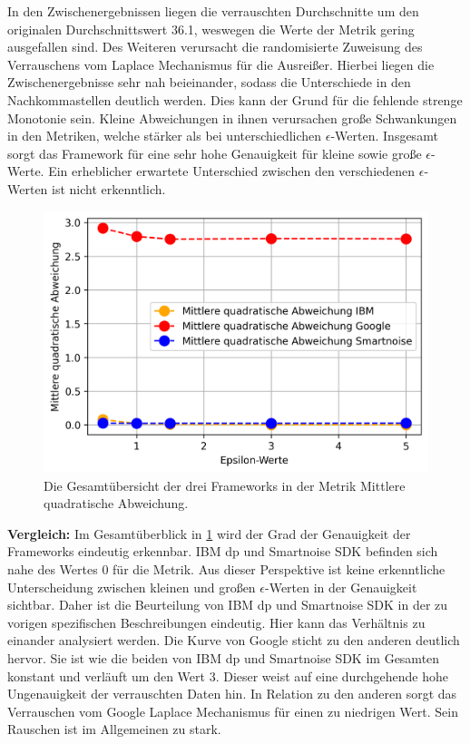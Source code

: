 In den Zwischenergebnissen liegen die verrauschten Durchschnitte um den originalen Durchschnittswert 36.1, weswegen die Werte der Metrik gering ausgefallen sind. Des Weiteren verursacht die randomisierte Zuweisung des Verrauschens vom Laplace Mechanismus für die Ausreißer. Hierbei liegen die Zwischenergebnisse sehr nah beieinander, sodass die Unterschiede in den Nachkommastellen deutlich werden. Dies kann der Grund für die fehlende strenge Monotonie sein. Kleine Abweichungen in ihnen verursachen große Schwankungen in den Metriken, welche stärker als bei unterschiedlichen $\epsilon$-Werten. Insgesamt sorgt das Framework für eine sehr hohe Genauigkeit für kleine sowie große $\epsilon$-Werte. Ein erheblicher erwartete Unterschied zwischen den verschiedenen $\epsilon$-Werten ist nicht erkenntlich.
\begin{figure}[!htbp]
	\centering
	\includegraphics[scale=0.6]{./images/together_mse.png}
	\caption{Die Gesamtübersicht der drei Frameworks in der Metrik Mittlere quadratische Abweichung.}
	\label{fig:together_mse}
\end{figure}

\textbf{Vergleich: }
Im Gesamtüberblick in \cref{fig:together_mse} wird der Grad der Genauigkeit der Frameworks eindeutig erkennbar. IBM \gls{dp} und Smartnoise SDK befinden sich nahe des Wertes $0$ für die Metrik. Aus dieser Perspektive ist keine erkenntliche Unterscheidung zwischen kleinen und großen $\epsilon$-Werten in der Genauigkeit sichtbar. Daher ist die Beurteilung von IBM \gls{dp} und Smartnoise SDK in der zu vorigen spezifischen Beschreibungen eindeutig. Hier kann das Verhältnis zu einander analysiert werden.
Die Kurve von Google sticht zu den anderen deutlich hervor. Sie ist wie die beiden von IBM \gls{dp} und Smartnoise SDK im Gesamten konstant und verläuft um den Wert 3. Dieser weist auf eine durchgehende hohe Ungenauigkeit der verrauschten Daten hin. In Relation zu den anderen sorgt das Verrauschen vom Google Laplace Mechanismus für einen zu niedrigen Wert. Sein Rauschen ist im Allgemeinen zu stark.


